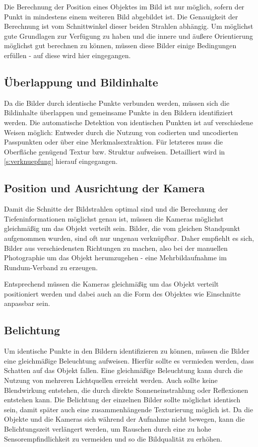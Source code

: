 \documentclass[./00PhotoBox.tex]{subfiles}
\begin{document}
Die Berechnung der Position eines Objektes im Bild ist nur möglich, sofern der Punkt in mindestens einem weiteren Bild abgebildet ist. Die Genauigkeit der Berechnung ist vom Schnittwinkel dieser beiden Strahlen abhängig. Um möglichst gute Grundlagen zur Ver\-fügung zu haben und die innere und äußere Orientierung möglichst gut berechnen zu können, müssen diese Bilder einige Bedingungen erfüllen - auf diese wird hier eingegangen.

\subsection{Überlappung und Bildinhalte}
Da die Bilder durch identische Punkte verbunden werden, müssen sich die Bildinhalte überlappen und gemeinsame Punkte in den Bildern identifiziert werden. Die automatische Detektion von identischen Punkten ist auf verschiedene Weisen möglich: Entweder durch die Nutzung von codierten und uncodierten Passpunkten oder über eine Merkmalsextraktion. Für letzteres muss die Oberfläche genügend Textur bzw. Struktur aufweisen. Detailliert wird in \autoref{s:verknuepfung} hierauf eingegangen. \citep[S. 478]{luhmann}

\subsection{Position und Ausrichtung der Kamera}
Damit die Schnitte der Bildstrahlen optimal sind und die Berechnung der Tiefeninformationen möglichst genau ist, müssen die Kameras möglichst gleichmäßig um das Objekt verteilt sein.
Bilder, die vom gleichen Standpunkt aufgenommen wurden, sind oft nur ungenau verknüpfbar. Daher empfiehlt es sich, Bilder aus verschiedensten Richtungen zu machen, also bei der manuellen Photographie um das Objekt herumzugehen - eine Mehrbildaufnahme im Rundum-Verband zu erzeugen. \citep[S. 170]{luhmann}

Entsprechend müssen die Kameras gleichmäßig um das Objekt verteilt positioniert werden und dabei auch an die Form des Objektes wie Einschnitte anpassbar sein.

\subsection{Belichtung}
Um identische Punkte in den Bildern identifizieren zu können, müssen die Bilder eine gleichmäßige Beleuchtung aufweisen. Hierfür sollte es vermieden werden, dass Schatten auf das Objekt fallen. Eine gleichmäßige Beleuchtung kann durch die Nutzung von mehreren Lichtquellen erreicht werden. Auch sollte keine Blendwirkung entstehen, die durch direkte Sonneneinstrahlung oder Reflexionen entstehen kann. Die Belichtung der einzelnen Bilder sollte möglichst identisch sein, damit später auch eine zusammenhängende Texturierung möglich ist.
Da die Objekte und die Kameras sich während der Aufnahme nicht bewegen, kann die Belichtungszeit verlängert werden, um Rauschen durch eine zu hohe Sensorempfindlichkeit zu vermeiden und so die Bildqualität zu erhöhen.
\end{document}
